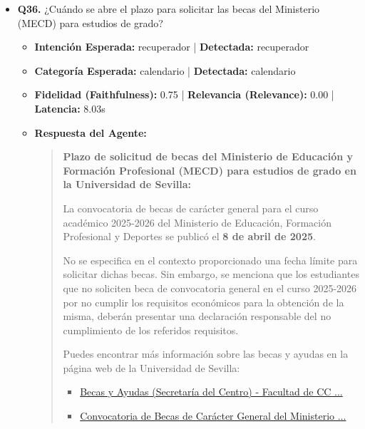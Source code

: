 \documentclass[12pt,a4paper,oneside]{report}
\begin{document}
\begin{itemize}
  
\item \textbf{Q36.} ¿Cuándo se abre el plazo para solicitar las becas del Ministerio (MECD) para estudios de grado? \\
        \begin{itemize}
          \item \textbf{Intención Esperada:} recuperador | \textbf{Detectada:} recuperador
          \item \textbf{Categoría Esperada:} calendario | \textbf{Detectada:} calendario
          \item \textbf{Fidelidad (Faithfulness):} 0.75 | \textbf{Relevancia (Relevance):} 0.00 | \textbf{Latencia:} 8.03s
          \item \textbf{{Respuesta del Agente:}} \\
                \begin{quote}
\textbf{Plazo de solicitud de becas del Ministerio de Educación y Formación Profesional (MECD) para estudios de grado en la Universidad de Sevilla:}

La convocatoria de becas de carácter general para el curso académico 2025-2026 del Ministerio de Educación, Formación Profesional y Deportes se publicó el \textbf{8 de abril de 2025}. 

No se especifica en el contexto proporcionado una fecha límite para solicitar dichas becas. Sin embargo, se menciona que los estudiantes que no soliciten beca de convocatoria general en el curso 2025-2026 por no cumplir los requisitos económicos para la obtención de la misma, deberán presentar una declaración responsable del no cumplimiento de los referidos requisitos.

Puedes encontrar más información sobre las becas y ayudas en la página web de la Universidad de Sevilla: 

\begin{itemize}
  \item \href{https://educacion.us.es/noticias/810-becas-y-ayudas}{Becas y Ayudas (Secretaría del Centro) - Facultad de CC ...}
  \item \href{https://www.us.es/comunicaciones-oficiales/convocatoria-de-becas-de-caracter-general-del-ministerio-curso-25-26}{Convocatoria de Becas de Carácter General del Ministerio ...}
\end{itemize}


\end{quote}
\end{itemize}
\end{itemize}
\end{document}
